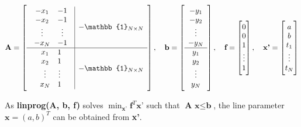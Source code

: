 \documentclass[paper=a4, fontsize=11pt]{scrartcl} %
\numberwithin{equation}{section} %
\numberwithin{figure}{section} %
\numberwithin{table}{section} %
\newcommand{\funcname}[1]{\textbf{#1}}
\renewcommand{\vec}[1]{\mathbf{#1}}
\begin{document}
\begin{gather*}
\textbf{A} = \left[
\begin{array}{c|c}
    \begin{array}{c c}
        -x_{1}	&	-1\\
        -x_{2}	&	-1\\
        \vdots	& \vdots \\
        -x_{N}	&	-1
    \end{array}
    &
    - \mathbb{1}_{N \times N} \\
    \hline
    \begin{array}{c c}
        x_{1}	&	1\\
        x_{2}	&	1\\
        \vdots	& \vdots \\
        x_{N}	&	1
    \end{array}
    &
    - \mathbb{1}_{N \times N} 
\end{array} \right],
\quad \textbf{b} = \left[
\begin{array}{c}
    -y_{1}	\\
    -y_{2}	\\
    \vdots	\\
    -y_{N}	\\
    \hline	
    y_{1}	\\
    y_{2}	\\
    \vdots	\\
    y_{N}
\end{array} \right], 
\quad \textbf{f} = 
    \begin{bmatrix}
    0\\
    0\\
    1\\
    \vdots	\\
    1
    \end{bmatrix}, 
\quad \textbf{x'} = 
    \begin{bmatrix}
    a\\
    b\\
    t_{1}\\
    \vdots	\\
    t_{N}
    \end{bmatrix}
\end{gather*}

As \funcname{linprog(A, b, f)} solves $\min_{\textbf{x'}} \textbf{f}^{T} \textbf{x'}$ such that $\textbf{A x} \leq \textbf{b}$, the line parameter $\vec{x} = (a, b)^{T}$ can be obtained from \textbf{x'}.

\end{document}

